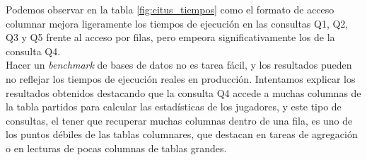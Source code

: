 Podemos observar en la tabla \ref{fig:citus_tiempos} como el formato de acceso columnar mejora ligeramente los tiempos de ejecución en las consultas Q1, Q2, Q3 y Q5 frente al acceso por filas, pero empeora significativamente los de la consulta Q4. \\

Hacer un \textit{benchmark} de bases de datos no es tarea fácil, y los resultados pueden no reflejar los tiempos de ejecución reales en producción. Intentamos explicar los resultados obtenidos destacando que la consulta Q4 accede a muchas columnas de la tabla partidos para calcular las estadísticas de los jugadores, y este tipo de consultas, el tener que recuperar muchas columnas dentro de una fila, es uno de los puntos débiles de las tablas columnares, que destacan en tareas de agregación o en lecturas de pocas columnas de tablas grandes.
